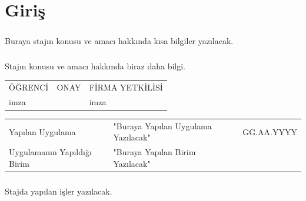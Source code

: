 \documentclass[12pt,a4paper]{report}
\begin{document}
\newpage
\chapter*{Giriş}

\paragraph{} Buraya stajın konusu ve amacı hakkında kısa bilgiler yazılacak.
\paragraph{} Stajın konusu ve amacı hakkında biraz daha bilgi.
\mbox{}
\vfill
\begin{center}
\begin{tabular}{|>{\centering}m{3.6cm}|>{\centering}m{7.4cm}|>{\centering}m{4cm}|}
ÖĞRENCİ&ONAY&FİRMA YETKİLİSİ
\tabularnewline
imza &&imza
\end{tabular}
\end{center}


\newpage %
 
\begin{center}
\begin{tabular}{llr}
\parbox[c]{5cm}{Yapılan Uygulama}
&\parbox[c]{8cm}{"Buraya Yapılan Uygulama Yazılacak"} %
&\parbox[c]{3cm}{GG.AA.YYYY}%
\\
\parbox[c]{5cm}{Uygulamanın Yapıldığı Birim}
&\parbox[c]{8cm}{"Buraya Yapılan Birim Yazılacak"} %
\end{tabular}
\end{center}

\paragraph{} Stajda yapılan işler yazılacak.
\end{document}
